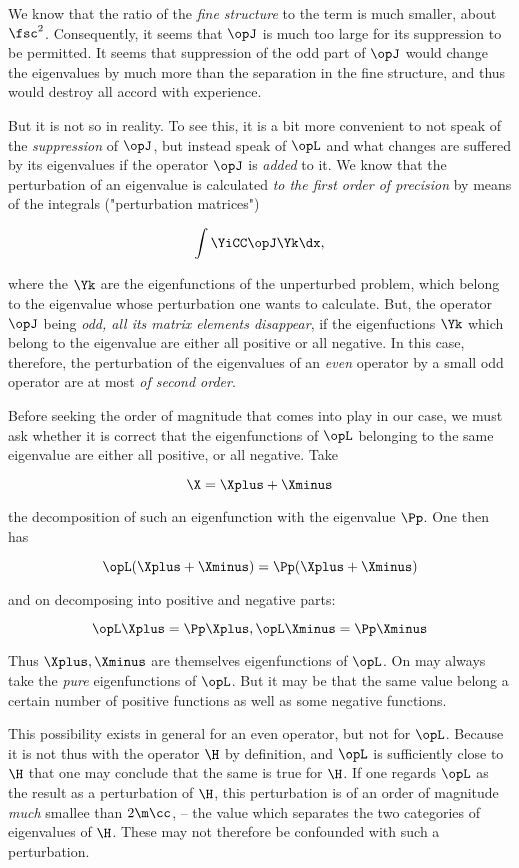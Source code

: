 \documentclass{article}
\newcommand{\uequ}[1]{
\begin{equation*}
#1
\end{equation*}
}
\renewcommand{\it}[1]{\textit{#1}}
\begin{document}
We know that the ratio of the \it{fine structure} to the term is much smaller, about $\fsc^2$. Consequently, it seems that $\opJ$ is much too large for its suppression to be permitted. It seems that suppression of the odd part of $\opJ$ would change the eigenvalues by much more than the separation in the fine structure, and thus would destroy all accord with experience.

But it is not so in reality. To see this, it is a bit more convenient to not speak of the \it{suppression} of $\opJ$, but instead speak of $\opL$ and what changes are suffered by its eigenvalues if the operator $\opJ$ is \it{added} to it. We know that the perturbation of an eigenvalue is calculated \it{to the first order of precision} by means of the integrals ("perturbation matrices")
\uequ{
\int\YiCC\opJ\Yk\dx,
}

where the $\Yk$ are the eigenfunctions of the unperturbed problem, which belong to the eigenvalue whose perturbation one wants to calculate. But, the operator $\opJ$ being \it{odd, all its matrix elements disappear}, if the eigenfuctions $\Yk$ which belong to the eigenvalue are either all positive or all negative. In this case, therefore, the perturbation of the eigenvalues of an \it{even} operator by a small odd operator are at most \it{of second order}.

Before seeking the order of magnitude that comes into play in our case, we must ask whether it is correct that the eigenfunctions of $\opL$ belonging to the same eigenvalue are either all positive, or all negative. Take
\uequ{
\X = \Xplus + \Xminus
}
the decomposition of such an eigenfunction with the eigenvalue $\Pp$. One then has
\uequ{
\opL(\Xplus + \Xminus) = \Pp(\Xplus + \Xminus)
}
and on decomposing into positive and negative parts:
\uequ{
\opL\Xplus = \Pp\Xplus, \opL\Xminus = \Pp\Xminus
}

Thus $\Xplus, \Xminus$ are themselves eigenfunctions of $\opL$. On may always take the \it{pure} eigenfunctions of $\opL$. But it may be that the same value belong a certain number of positive functions as well as some negative functions.

This possibility exists in general for an even operator, but not for $\opL$. Because it is not thus with the operator $\H$ by definition, and $\opL$ is sufficiently close to $\H$ that one may conclude that the same is true for $\H$. If one regards $\opL$ as the result as a perturbation of $\H$, this perturbation is of an order of magnitude \it{much} smallee than $2\m\cc$, -- the value which separates the two categories of eigenvalues of $\H$. These may not therefore be confounded with such a perturbation.
\end{document}
